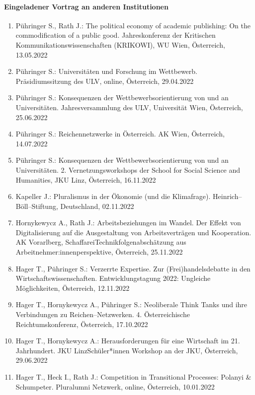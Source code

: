 \paragraph{Eingeladener Vortrag an anderen Institutionen}
\begin{enumerate}
	\item Pühringer S., Rath J.: The political economy of academic publishing: On the commodification of a public good. Jahreskonferenz der Kritischen Kommunikationswissenschaften (KRIKOWI), WU Wien, Österreich, 13.05.2022
	\item Pühringer S.: Universitäten und Forschung im Wettbewerb. Präsidiumssitzung des ULV, online, Österreich, 29.04.2022
	\item Pühringer S.: Konsequenzen der Wettbewerbsorientierung von und an Universitäten. Jahresversammlung des ULV, Universität Wien, Österreich, 25.06.2022
	\item Pühringer S.: Reichennetzwerke in Österreich. AK Wien, Österreich, 14.07.2022
	\item Pühringer S.: Konsequenzen der Wettbewerbsorientierung von und an Universitäten. 2. Vernetzungsworkshops der School for Social Science and Humanities, JKU Linz, Österreich, 16.11.2022
	\item Kapeller J.: Pluralismus in der Ökonomie (und die Klimafrage). Heinrich--Böll--Stiftung, Deutschland, 02.11.2022
	\item Hornykewycz A., Rath J.: Arbeitsbeziehungen im Wandel. Der Effekt von Digitalisierung auf die Ausgestaltung von Arbeitsverträgen und Kooperation. AK Vorarlberg, SchaffareiTechnikfolgenabschätzung aus Arbeitnehmer:innenperspektive, Österreich, 25.11.2022
	\item Hager T., Pühringer S.: Verzerrte Expertise. Zur (Frei)handelsdebatte in den Wirtschaftswissenschaften. Entwicklungstagung 2022: Ungleiche Möglichkeiten, Österreich, 12.11.2022
	\item Hager T., Hornykewycz A., Pühringer S.: Neoliberale Think Tanks und ihre Verbindungen zu Reichen--Netzwerken. 4. Österreichische Reichtumskonferenz, Österreich, 17.10.2022
	\item Hager T., Hornykewycz A.: Herausforderungen für eine Wirtschaft im 21. Jahrhundert. JKU LinzSchüler*innen Workshop an der JKU, Österreich, 29.06.2022
	\item Hager T., Heck I., Rath J.: Competition in Transitional Processes: Polanyi \& Schumpeter. Pluralumni Netzwerk, online, Österreich, 10.01.2022
\end{enumerate}
